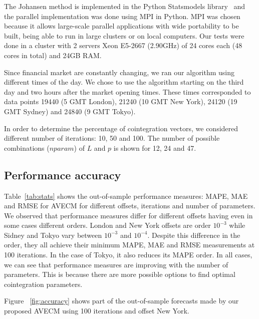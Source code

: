The Johansen method is implemented in the Python Statsmodels
library~\cite{seabold2010} and the parallel implementation was done using
MPI in Python. 
MPI was chosen because it allows large-scale parallel applications
with wide portability to be built, being able to run in large clusters
or on local computers.
Our tests were done in a cluster with 2 servers Xeon E5-2667 (2.90GHz)
of 24 cores each (48 cores in total) and 24GB RAM.

Since financial market are constantly changing, we ran our
algorithm using different times of the day. We chose to use the algorithm
starting on the third day and two hours after the market opening times. These
times corresponded to data points 19440 (5 GMT London), 21240 (10 GMT New
York), 24120 (19 GMT Sydney) and 24840 (9 GMT Tokyo).

In order to determine the percentage of cointegration vectors, we considered
different number of iterations: 10, 50 and 100. The number of possible
combinations ($nparam$) of $L$ and $p$ is shown for 12, 24 and 47.


\subsection{Performance accuracy} \label{sec:performacc}

Table~\ref{tab:stats} shows the out-of-sample performance measures: MAPE, MAE
and RMSE for AVECM for different offsets, iterations and number of parameters.
We observed that performance measures differ for different offsets having even
in some cases different orders. London and New York offsets are order $10^{-3}$
while Sidney and Tokyo vary between $10^{-3}$ and $10^{-4}$. Despite this
difference in the order, they all achieve their minimum MAPE, MAE and RMSE
measurements at 100 iterations. In the case of Tokyo, it also reduces its MAPE
order. In all cases, we can see that performance measures are improving with
the number of parameters.  This is because there are more possible options to find
optimal cointegration parameters.

Figure ~\ref{fig:accuracy} shows part of the out-of-sample forecasts made by
our proposed AVECM using 100 iterations and offset New York.

